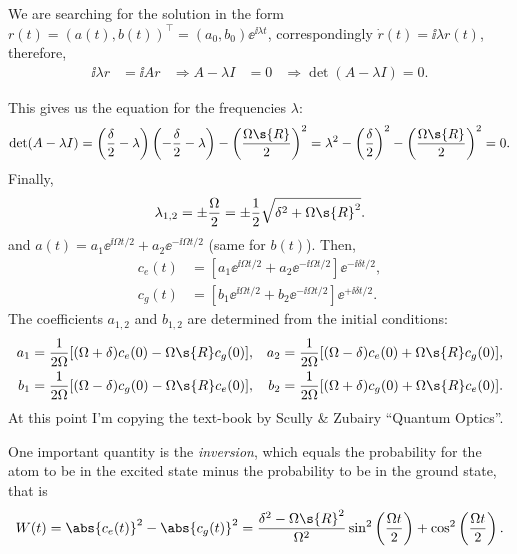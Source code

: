 \documentclass[fontsize=9pt,bookmarkpackage=false]{scrartcl}
\begin{document}
We are searching for the solution in the form $r(t) = (a(t), b(t))^\intercal = (a_0 , b_0) \ee^{ \ii \lambda t }$, correspondingly $\dot r(t) = \ii \lambda r(t)$, therefore,
\begin{align}
  \ii \lambda r & = \ii A r
  &
  \Longrightarrow
  A - \lambda I & = 0
  &
  \Longrightarrow
  \det( A - \lambda I ) = 0.
\end{align}

This gives us the equation for the frequencies $\lambda$:
\begin{equation}
  \det( A - \lambda I )
  =
  \left( \frac{ \delta }{ 2 } - \lambda \right)\left( - \frac{ \delta }{ 2 } - \lambda \right)
  - \left( \frac{ \Omega\s{R} }{ 2 }  \right)^2
  = \lambda^2 - \left( \frac{ \delta }{ 2 } \right)^2 - \left( \frac{ \Omega\s{R} }{ 2 } \right)^2 = 0.
\end{equation}
Finally,
\begin{equation}
  \lambda_{1,2 } = \pm \frac \Omega 2 = \pm \frac 12 \sqrt{ \delta^2 + \Omega\s{R}^2 }.
\end{equation}
and $a(t) = a_1 \ee^{ \ii \Omega t / 2 } + a_2 \ee^{ - \ii \Omega t / 2}$ (same for $b(t)$).
Then,
\begin{align}
  c_e (t) & = [
  a_1 \ee^{ \ii \Omega t / 2 }
  +
  a_2 \ee^{ - \ii \Omega t / 2 }
  ] \ee^{ - \ii \delta t / 2 },
  \\
  c_g (t) & = [
  b_1 \ee^{ \ii \Omega t / 2 }
  +
  b_2 \ee^{ - \ii \Omega t / 2 }
  ] \ee^{ + \ii \delta t / 2 }.
\end{align}
The coefficients $a_{1,2}$ and $b_{1,2}$ are determined from the initial conditions:
\begin{align}
  a_1 & = \frac{ 1 }{ 2 \Omega } [ ( \Omega + \delta ) c_e (0) - \Omega\s{R} c_g (0) ], &
  a_2 & = \frac{ 1 }{ 2 \Omega } [ ( \Omega - \delta ) c_e (0) + \Omega\s{R} c_g (0) ],
  \\
  b_1 & = \frac{ 1 }{ 2 \Omega } [ ( \Omega - \delta ) c_g (0) - \Omega\s{R} c_e (0) ], &
  b_2 & = \frac{ 1 }{ 2 \Omega } [ ( \Omega + \delta ) c_g (0) + \Omega\s{R} c_e (0) ].
\end{align}
At this point I'm copying the text-book by Scully \& Zubairy ``Quantum Optics''.

One important quantity is the \emph{inversion}, which equals the probability for the atom to be in the excited state minus the probability to be in the ground state, that is
\begin{equation}
  W(t) = \abs{ c_e (t) }^2 - \abs{ c_g (t) }^2 =
  \frac{ \delta^2 - \Omega\s{R}^2 }{ \Omega^2 }
  \sin^2 \left( \frac{ \Omega t }{ 2 } \right) +
  \cos^2 \left( \frac{ \Omega t }{ 2 } \right).
\end{equation}
\end{document}
